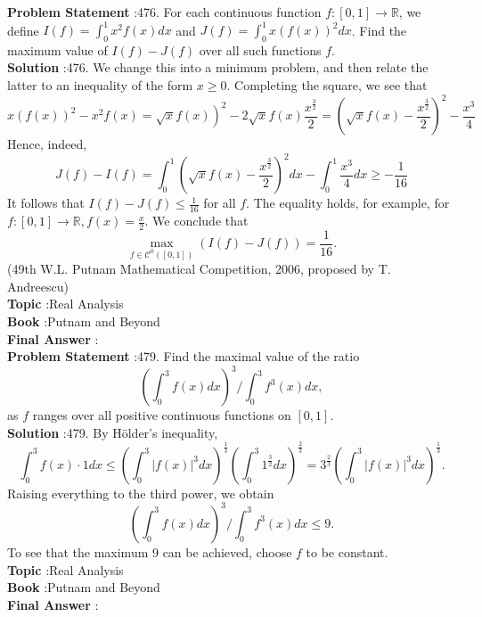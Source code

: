 \documentclass[10pt]{article}
\begin{document}
\textbf{Problem Statement} :476. For each continuous function $f:[0,1] \rightarrow \mathbb{R}$, we define $I(f)=\int_{0}^{1} x^{2} f(x) d x$ and $J(f)=\int_{0}^{1} x(f(x))^{2} d x$. Find the maximum value of $I(f)-J(f)$ over all such functions $f$.\\
\textbf{Solution} :476. We change this into a minimum problem, and then relate the latter to an inequality of the form $x \geq 0$. Completing the square, we see that$$ \left.x(f(x))^{2}-x^{2} f(x)=\sqrt{x} f(x)\right)^{2}-2 \sqrt{x} f(x) \frac{x^{\frac{3}{2}}}{2}=\left(\sqrt{x} f(x)-\frac{x^{\frac{3}{2}}}{2}\right)^{2}-\frac{x^{3}}{4} $$Hence, indeed,$$ J(f)-I(f)=\int_{0}^{1}\left(\sqrt{x} f(x)-\frac{x^{\frac{3}{2}}}{2}\right)^{2} d x-\int_{0}^{1} \frac{x^{3}}{4} d x \geq-\frac{1}{16} $$It follows that $I(f)-J(f) \leq \frac{1}{16}$ for all $f$. The equality holds, for example, for $f:[0,1] \rightarrow \mathbb{R}, f(x)=\frac{x}{2}$. We conclude that$$ \max _{f \in \mathcal{C}^{0}([0,1])}(I(f)-J(f))=\frac{1}{16} . $$(49th W.L. Putnam Mathematical Competition, 2006, proposed by T. Andreescu) \\
\textbf{Topic} :Real Analysis\\
\textbf{Book} :Putnam and Beyond\\
\textbf{Final Answer} :\\


\textbf{Problem Statement} :479. Find the maximal value of the ratio$$ \left(\int_{0}^{3} f(x) d x\right)^{3} / \int_{0}^{3} f^{3}(x) d x, $$as $f$ ranges over all positive continuous functions on $[0,1]$. \\
\textbf{Solution} :479. By Hölder's inequality,$$ \int_{0}^{3} f(x) \cdot 1 d x \leq\left(\int_{0}^{3}|f(x)|^{3} d x\right)^{\frac{1}{3}}\left(\int_{0}^{3} 1^{\frac{3}{2}} d x\right)^{\frac{2}{3}}=3^{\frac{2}{3}}\left(\int_{0}^{3}|f(x)|^{3} d x\right)^{\frac{1}{3}} . $$Raising everything to the third power, we obtain$$ \left(\int_{0}^{3} f(x) d x\right)^{3} / \int_{0}^{3} f^{3}(x) d x \leq 9 . $$To see that the maximum 9 can be achieved, choose $f$ to be constant.\\
\textbf{Topic} :Real Analysis\\
\textbf{Book} :Putnam and Beyond\\
\textbf{Final Answer} :\\
\end{document}
